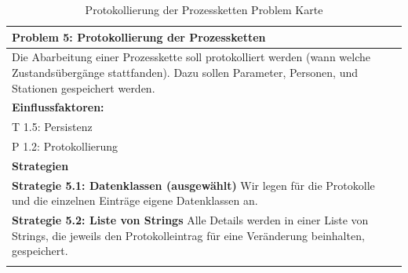 \documentclass[enabledeprecatedfontcommands,fontsize=12pt,paper=a4,twoside]{scrartcl}
\begin{document}
\begin{table}[H]
    \centering
    \begin{tabular}{|p{15cm}|}
    \hline
          \textbf{Problem 5:} Protokollierung der Prozessketten
          \\ \hline
          Die Abarbeitung einer Prozesskette soll protokolliert werden (wann welche Zustandsübergänge stattfanden). Dazu sollen Parameter, Personen, und Stationen gespeichert werden. %
          \\ \hline
          \textbf{Einflussfaktoren: } \\
          T 1.5: Persistenz \\
          P 1.2: Protokollierung\\
          \hline
          \textbf{Strategien} \\ \hline
	\textbf{Strategie 5.1: Datenklassen (ausgewählt)} Wir legen für die Protokolle und die einzelnen Einträge eigene Datenklassen an.\\
        \textbf{Strategie 5.2: Liste von Strings} Alle Details werden in einer Liste von Strings, die jeweils den Protokolleintrag für eine Veränderung beinhalten, gespeichert. \\
          \\ \hline
    \end{tabular}

    \caption{Protokollierung der Prozessketten Problem Karte}

    \label{tab:ProblemKarte5}
\end{table}





\end{document}

